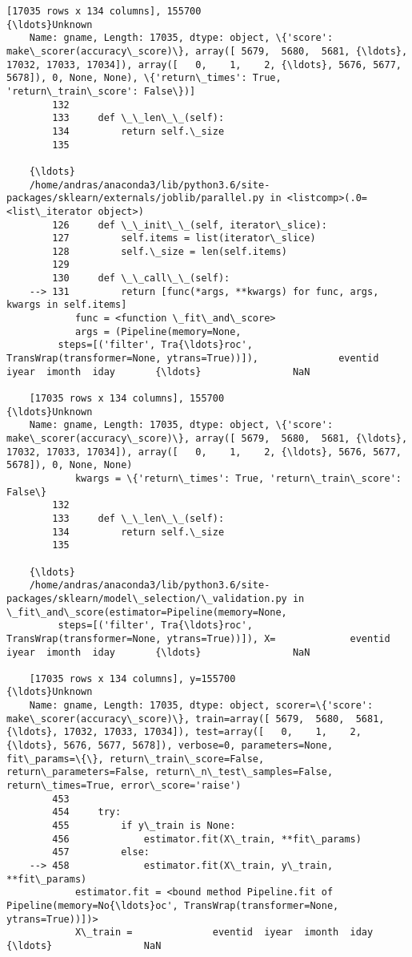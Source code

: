 \documentclass[11pt]{article}
\begin{document}
\begin{Verbatim}[commandchars=\\\{\}]
    [17035 rows x 134 columns], 155700                                          {\ldots}Unknown
    Name: gname, Length: 17035, dtype: object, \{'score': make\_scorer(accuracy\_score)\}, array([ 5679,  5680,  5681, {\ldots}, 17032, 17033, 17034]), array([   0,    1,    2, {\ldots}, 5676, 5677, 5678]), 0, None, None), \{'return\_times': True, 'return\_train\_score': False\})]
        132 
        133     def \_\_len\_\_(self):
        134         return self.\_size
        135 
    
    {\ldots}
    /home/andras/anaconda3/lib/python3.6/site-packages/sklearn/externals/joblib/parallel.py in <listcomp>(.0=<list\_iterator object>)
        126     def \_\_init\_\_(self, iterator\_slice):
        127         self.items = list(iterator\_slice)
        128         self.\_size = len(self.items)
        129 
        130     def \_\_call\_\_(self):
    --> 131         return [func(*args, **kwargs) for func, args, kwargs in self.items]
            func = <function \_fit\_and\_score>
            args = (Pipeline(memory=None,
         steps=[('filter', Tra{\ldots}roc', TransWrap(transformer=None, ytrans=True))]),              eventid  iyear  imonth  iday       {\ldots}                NaN  
    
    [17035 rows x 134 columns], 155700                                          {\ldots}Unknown
    Name: gname, Length: 17035, dtype: object, \{'score': make\_scorer(accuracy\_score)\}, array([ 5679,  5680,  5681, {\ldots}, 17032, 17033, 17034]), array([   0,    1,    2, {\ldots}, 5676, 5677, 5678]), 0, None, None)
            kwargs = \{'return\_times': True, 'return\_train\_score': False\}
        132 
        133     def \_\_len\_\_(self):
        134         return self.\_size
        135 
    
    {\ldots}
    /home/andras/anaconda3/lib/python3.6/site-packages/sklearn/model\_selection/\_validation.py in \_fit\_and\_score(estimator=Pipeline(memory=None,
         steps=[('filter', Tra{\ldots}roc', TransWrap(transformer=None, ytrans=True))]), X=             eventid  iyear  imonth  iday       {\ldots}                NaN  
    
    [17035 rows x 134 columns], y=155700                                          {\ldots}Unknown
    Name: gname, Length: 17035, dtype: object, scorer=\{'score': make\_scorer(accuracy\_score)\}, train=array([ 5679,  5680,  5681, {\ldots}, 17032, 17033, 17034]), test=array([   0,    1,    2, {\ldots}, 5676, 5677, 5678]), verbose=0, parameters=None, fit\_params=\{\}, return\_train\_score=False, return\_parameters=False, return\_n\_test\_samples=False, return\_times=True, error\_score='raise')
        453 
        454     try:
        455         if y\_train is None:
        456             estimator.fit(X\_train, **fit\_params)
        457         else:
    --> 458             estimator.fit(X\_train, y\_train, **fit\_params)
            estimator.fit = <bound method Pipeline.fit of Pipeline(memory=No{\ldots}oc', TransWrap(transformer=None, ytrans=True))])>
            X\_train =              eventid  iyear  imonth  iday       {\ldots}                NaN  
    

\end{Verbatim}
\end{document}
